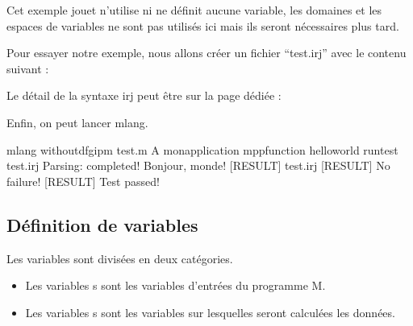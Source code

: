 \documentclass[letterpaper,10pt,french]{sphinxmanual}
\begin{document}
\sphinxAtStartPar
Cet exemple jouet n’utilise ni ne définit aucune variable, les domaines
et les espaces de variables ne sont pas utilisés ici mais ils seront nécessaires
plus tard.

\sphinxAtStartPar
Pour essayer notre exemple, nous allons créer un fichier “test.irj” avec le
contenu suivant :

\begin{sphinxVerbatim}[commandchars=\\\{\}]
\end{sphinxVerbatim}

\sphinxAtStartPar
Le détail de la syntaxe irj peut être sur la page dédiée : {\hyperref[\detokenize{syntax_irj:syntax-irj}]{}}

\sphinxAtStartPar
Enfin, on peut lancer mlang.

\begin{sphinxVerbatim}[commandchars=\\\{\}]
 \PYGZdl{} mlang \PYGZhy{}\PYGZhy{}without\PYGZus{}dfgip\PYGZus{}m test.m \PYGZhy{}A mon\PYGZus{}application \PYGZhy{}\PYGZhy{}mpp\PYGZus{}function hello\PYGZus{}world \PYGZhy{}\PYGZhy{}run\PYGZus{}test test.irj
 Parsing: completed!
 Bonjour, monde!
 [RESULT] test.irj
 [RESULT] No failure!
 [RESULT] Test passed!
\end{sphinxVerbatim}


\subsection{Définition de variables}
\label{\detokenize{intro:definition-de-variables}}
\sphinxAtStartPar
Les variables sont divisées en deux catégories.
\begin{itemize}
\item {} 
\sphinxAtStartPar
Les variables s sont les variables d’entrées du
programme M.

\item {} 
\sphinxAtStartPar
Les variables s sont les variables sur lesquelles seront
calculées les données.

\end{itemize}
\end{document}
